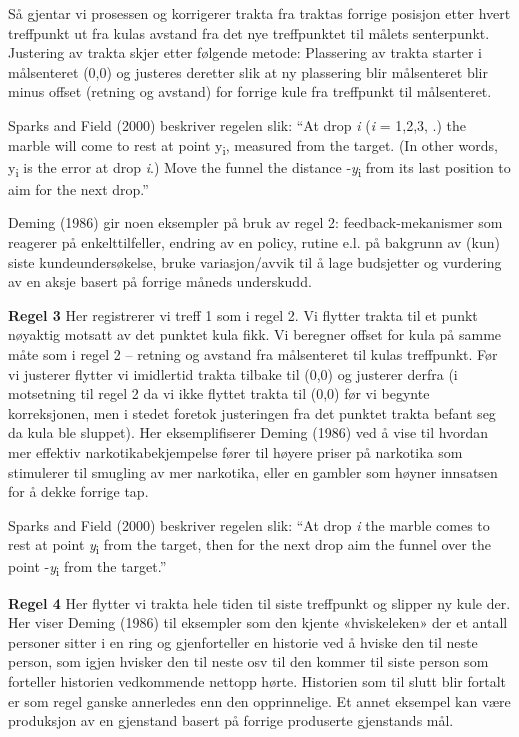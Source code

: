\documentclass[
]{book}
\begin{document}
Så gjentar vi prosessen og korrigerer trakta fra traktas forrige posisjon etter hvert treffpunkt ut fra kulas avstand fra det nye treffpunktet til målets senterpunkt. Justering av trakta skjer etter følgende metode: Plassering av trakta starter i målsenteret (0,0) og justeres deretter slik at ny plassering blir målsenteret blir minus offset (retning og avstand) for forrige kule fra treffpunkt til målsenteret.

Sparks and Field (2000) beskriver regelen slik: ``At drop \emph{i} (\emph{i} = 1,2,3, .) the marble will come to rest at point y\textsubscript{i}, measured from the target. (In other words, y\textsubscript{i} is the error at drop \emph{i}.) Move the funnel the distance -\emph{y}\textsubscript{i} from its last position to aim for the next drop.''

Deming (1986) gir noen eksempler på bruk av regel 2: feedback-mekanismer som reagerer på enkelttilfeller, endring av en policy, rutine e.l. på bakgrunn av (kun) siste kundeundersøkelse, bruke variasjon/avvik til å lage budsjetter og vurdering av en aksje basert på forrige måneds underskudd.

\textbf{Regel 3}
Her registrerer vi treff 1 som i regel 2. Vi flytter trakta til et punkt nøyaktig motsatt av det punktet kula fikk. Vi beregner offset for kula på samme måte som i regel 2 -- retning og avstand fra målsenteret til kulas treffpunkt. Før vi justerer flytter vi imidlertid trakta tilbake til (0,0) og justerer derfra (i motsetning til regel 2 da vi ikke flyttet trakta til (0,0) før vi begynte korreksjonen, men i stedet foretok justeringen fra det punktet trakta befant seg da kula ble sluppet). Her eksemplifiserer Deming (1986) ved å vise til hvordan mer effektiv narkotikabekjempelse fører til høyere priser på narkotika som stimulerer til smugling av mer narkotika, eller en gambler som høyner innsatsen for å dekke forrige tap.

Sparks and Field (2000) beskriver regelen slik: ``At drop \emph{i} the marble comes to rest at point \emph{y}\textsubscript{i} from the target, then for the next drop aim the funnel over the point -\emph{y}\textsubscript{i} from the target.''

\textbf{Regel 4}
Her flytter vi trakta hele tiden til siste treffpunkt og slipper ny kule der. Her viser Deming (1986) til eksempler som den kjente «hviskeleken» der et antall personer sitter i en ring og gjenforteller en historie ved å hviske den til neste person, som igjen hvisker den til neste osv til den kommer til siste person som forteller historien vedkommende nettopp hørte. Historien som til slutt blir fortalt er som regel ganske annerledes enn den opprinnelige. Et annet eksempel kan være produksjon av en gjenstand basert på forrige produserte gjenstands mål.
\end{document}
